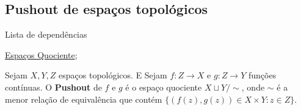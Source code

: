 \subsection{Pushout de espaços topológicos} %
\label{pushout-de-espacos-topologicos-def}
\begin{titlemize}{Lista de dependências}
	\item \hyperref[topologia-quociente-def]{Espaços Quociente};\\ %
\end{titlemize}

\begin{defi}
    Sejam $X,Y,Z$ espaços topológicos. E Sejam $f:Z\rightarrow X$ e $g:Z\rightarrow Y$ funções contínuas. O \textbf{Pushout} de $f$ e $g$ é o espaço quociente $X\sqcup Y/\sim$, onde $\sim$ é a menor relação de equivalência que contém $\{(f(z),g(z))\in X\times Y:z\in Z\}$.
\end{defi}


